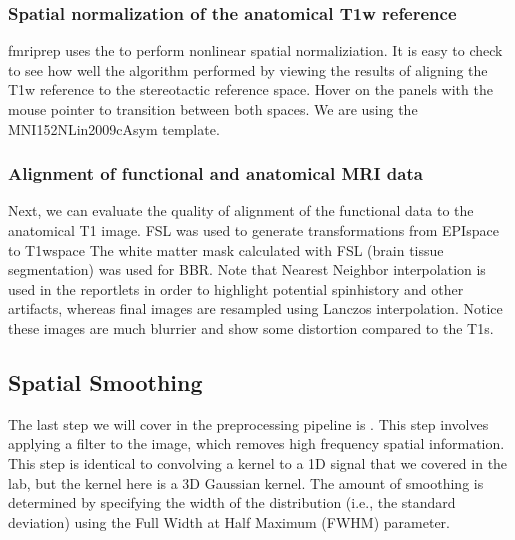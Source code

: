 \documentclass[letterpaper,10pt,english]{sphinxmanual}
\begin{document}
\subsubsection{Spatial normalization of the anatomical T1w reference}
\label{\detokenize{content/Preprocessing:spatial-normalization-of-the-anatomical-t1w-reference}}
fmriprep uses the  to perform nonlinear spatial normaliziation. It is easy to check to see how well the algorithm performed by viewing the results of aligning the T1w reference to the stereotactic reference space. Hover on the panels with the mouse pointer to transition between both spaces. We are using the MNI152NLin2009cAsym template.


\subsubsection{Alignment of functional and anatomical MRI data}
\label{\detokenize{content/Preprocessing:alignment-of-functional-and-anatomical-mri-data}}
Next, we can evaluate the quality of alignment of the functional data to the anatomical T1 image. FSL  was used to generate transformations from EPI\sphinxhyphen{}space to T1w\sphinxhyphen{}space \sphinxhyphen{} The white matter mask calculated with FSL  (brain tissue segmentation) was used for BBR. Note that Nearest Neighbor interpolation is used in the reportlets in order to highlight potential spin\sphinxhyphen{}history and other artifacts, whereas final images are resampled using Lanczos interpolation. Notice these images are much blurrier and show some distortion compared to the T1s.


\subsection{Spatial Smoothing}
\label{\detokenize{content/Preprocessing:spatial-smoothing}}
The last step we will cover in the preprocessing pipeline is . This step involves applying a filter to the image, which removes high frequency spatial information. This step is identical to convolving a kernel to a 1\sphinxhyphen{}D signal that we covered in the {\hyperref[\detokenize{content/Signal_Processing::doc}]{}} lab, but the kernel here is a 3\sphinxhyphen{}D Gaussian kernel. The amount of smoothing is determined by specifying the width of the distribution (i.e., the standard deviation) using the Full Width at Half Maximum (FWHM) parameter.
\end{document}
